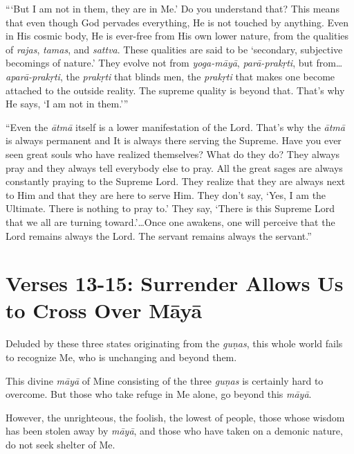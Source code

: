 \enquote{\enquote{But I am not in them, they are in Me.} Do you understand that? This means that even though God pervades everything, He is not touched by anything. Even in His cosmic body, He is ever-free from His own lower nature, from the qualities of \textit{rajas}, \textit{tamas}, and \textit{sattva}. These qualities are said to be \enquote{secondary, subjective becomings of nature.} They evolve not from \textit{yoga-māyā}, \textit{parā-prakṛti}, but from\ldots \textit{aparā-prakṛti}, the \textit{prakṛti} that blinds men, the \textit{prakṛti} that makes one become attached to the outside reality. The supreme quality is beyond that. That’s why He says, \enquote{I am not in them.}}

\enquote{Even the \textit{ātmā} itself is a lower manifestation of the Lord. That’s why the \textit{ātmā} is always permanent and It is always there serving the Supreme. Have you ever seen great souls who have realized themselves? What do they do? They always pray and they always tell everybody else to pray. All the great sages are always constantly praying to the Supreme Lord. They realize that they are always next to Him and that they are here to serve Him. They don’t say, \enquote{Yes, I am the Ultimate. There is nothing to pray to.} They say, \enquote{There is this Supreme Lord that we all are turning toward.}\ldots Once one awakens, one will perceive that the Lord remains always the Lord. The servant remains always the servant.}

\section{Verses 13-15: Surrender Allows Us to Cross Over Māyā}\label{sec-verses-13-15-surrender-allows-us-to-cross-over-maya}

{Deluded by these three states originating from the \textit{guṇas}, this whole world fails to recognize Me, who is unchanging and beyond them.}

{This divine \textit{māyā} of Mine consisting of the three \textit{guṇas} is certainly hard to overcome. But those who take refuge in Me alone, go beyond this \textit{māyā}.}

{However, the unrighteous, the foolish, the lowest of people, those whose wisdom has been stolen away by \textit{māyā}, and those who have taken on a demonic nature, do not seek shelter of Me.}

